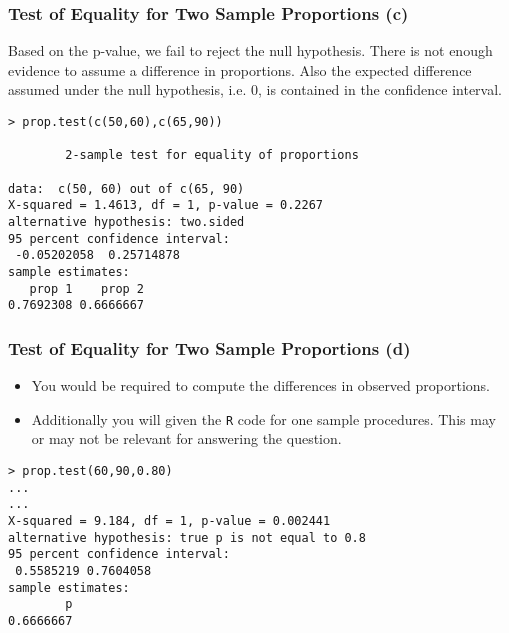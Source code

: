 \documentclass[a4]{beamer}
\begin{document}
\begin{frame}[fragile]
\frametitle{Test of Equality for Two Sample Proportions (c)}
Based on the p-value, we fail to reject the null hypothesis. There is not enough evidence to assume a difference in proportions. Also the expected difference assumed under the null hypothesis, i.e. 0, is contained in the confidence interval.
\begin{verbatim}
> prop.test(c(50,60),c(65,90))

        2-sample test for equality of proportions

data:  c(50, 60) out of c(65, 90)
X-squared = 1.4613, df = 1, p-value = 0.2267
alternative hypothesis: two.sided
95 percent confidence interval:
 -0.05202058  0.25714878
sample estimates:
   prop 1    prop 2
0.7692308 0.6666667
\end{verbatim}
\end{frame}
\begin{frame}[fragile]
\frametitle{Test of Equality for Two Sample Proportions (d)}
\begin{itemize}
\item You would be required to compute the differences in observed proportions.
\item Additionally you will given the \texttt{R} code for one sample procedures. This may or may not be relevant for answering the question.
\end{itemize}
\begin{verbatim}
> prop.test(60,90,0.80)
...
...
X-squared = 9.184, df = 1, p-value = 0.002441
alternative hypothesis: true p is not equal to 0.8
95 percent confidence interval:
 0.5585219 0.7604058
sample estimates:
        p
0.6666667
\end{verbatim}

\end{frame}
\end{document}
